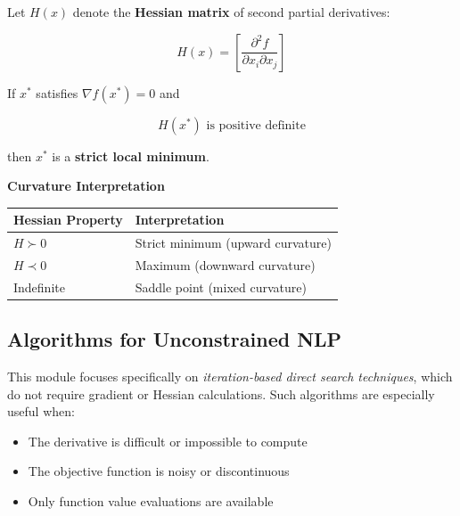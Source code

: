 \documentclass[
  letterpaper,
  DIV=11,
  numbers=noendperiod]{scrreprt}
\providecommand{\tightlist}{%
  \setlength{\itemsep}{0pt}\setlength{\parskip}{0pt}}
\begin{document}
\begin{tcolorbox}[enhanced jigsaw, leftrule=.75mm, rightrule=.15mm, colback=white, colbacktitle=quarto-callout-note-color!10!white, arc=.35mm, opacityback=0, toptitle=1mm, bottomrule=.15mm, bottomtitle=1mm, titlerule=0mm, title=\textcolor{quarto-callout-note-color}{\faInfo}\hspace{0.5em}{Second-Order Sufficient Condition (SOSC)}, toprule=.15mm, left=2mm, coltitle=black, breakable, colframe=quarto-callout-note-color-frame, opacitybacktitle=0.6]

Let \(H(x)\) denote the \textbf{Hessian matrix} of second partial
derivatives:

\[
H(x) = \left[ \frac{\partial^{2} f}{\partial x_i \partial x_j} \right]
\]

If \(x^{*}\) satisfies \(\nabla f(x^{*}) = 0\) and

\[
H(x^{*}) \text{ is positive definite}
\]

then \(x^{*}\) is a \textbf{strict local minimum}.

\end{tcolorbox}

\textbf{Curvature Interpretation}

\begin{longtable}[]{@{}ll@{}}
\toprule\noalign{}
Hessian Property & Interpretation \\
\midrule\noalign{}
\endhead
\bottomrule\noalign{}
\endlastfoot
\(H \succ 0\) & Strict minimum (upward curvature) \\
\(H \prec 0\) & Maximum (downward curvature) \\
Indefinite & Saddle point (mixed curvature) \\
\end{longtable}

\subsection{Algorithms for Unconstrained
NLP}\label{algorithms-for-unconstrained-nlp}

This module focuses specifically on \emph{iteration-based direct search
techniques}, which do not require gradient or Hessian calculations. Such
algorithms are especially useful when:

\begin{itemize}
\tightlist
\item
  The derivative is difficult or impossible to compute
\item
  The objective function is noisy or discontinuous
\item
  Only function value evaluations are available
\end{itemize}
\end{document}
